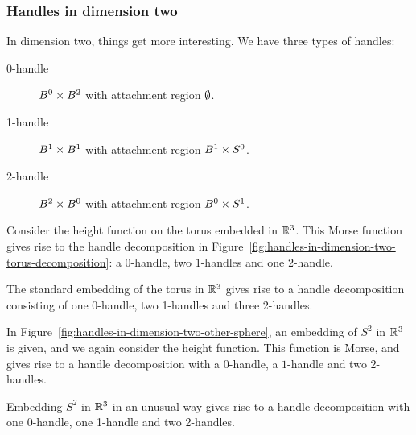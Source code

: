 \subsubsection*{Handles in dimension two}
In dimension two, things get more interesting.
We have three types of handles:

\begin{description}
    \item[0-handle] $B^{0} \times B^{2}$ with attachment region $\emptyset$. \hfill {}
    \item[1-handle] $B^{1} \times B^{1}$ with attachment region $B^{1} \times S^{0}$. \hfill{}
    \item[2-handle] $B^{2} \times B^{0}$ with attachment region $B^{0} \times S^1$. \hfill{}
\end{description}

\begin{eg}
    Consider the height function on the torus embedded in $\mathbb{R}^3$. This Morse function gives rise to the handle decomposition in Figure~\ref{fig:handles-in-dimension-two-torus-decomposition}: a $0$-handle, two $1$-handles and one $2$-handle.
\end{eg}

\begin{marginfigure}
    \centering
    \caption{The standard embedding of the torus in $\mathbb{R}^3$ gives rise to a handle decomposition consisting of one  0-handle, two 1-handles and three 2-handles.}
    \label{fig:handles-in-dimension-two-torus-decomposition}
\end{marginfigure}

\begin{eg}
    In Figure~\ref{fig:handles-in-dimension-two-other-sphere}, an embedding of $S^2$ in $\mathbb{R}^3$ is given, and we again consider the height function.
    This function is Morse, and gives rise to a handle decomposition with a $0$-handle, a $1$-handle and two $2$-handles.
\end{eg}
\begin{marginfigure}
    \centering
    \caption{Embedding $S^2$ in $ \mathbb{R}^3$ in an unusual way gives rise to a handle decomposition with one 0-handle, one 1-handle and two 2-handles. }
    \label{fig:handles-in-dimension-two-other-sphere}
\end{marginfigure}




